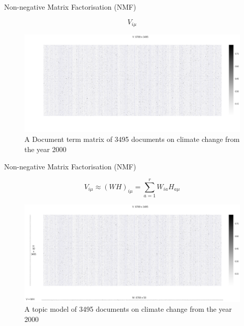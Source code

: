 \documentclass[9pt]{beamer}
\begin{document}
\begin{frame}{Non-negative Matrix Factorisation (NMF)}

\citep{Lee1999}

\begin{figure}
	
	\[V_{i\mu} \]
	
	\includegraphics[width=\linewidth]{images/VWH_blank.png}
	
	\caption{A Document term matrix of 3495 documents on climate change from the year 2000}
	
\end{figure}

\end{frame}


\begin{frame}{Non-negative Matrix Factorisation (NMF)}

\citep{Lee1999}

\begin{figure}

\[V_{i\mu} \approx (WH)_{i\mu} = \sum_{a=1}^{r}W_{ia}H_{a\mu} \]

\includegraphics[width=\linewidth]{images/VWH.png}

	\caption{A topic model of 3495 documents on climate change from the year 2000}

\end{figure}


\end{frame}
\end{document}
